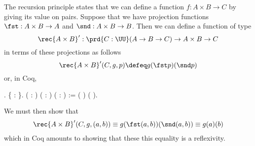  \soln 
The recursion principle states that we can define a function $f : A \times B
\to C$ by giving its value on pairs.  Suppose that we have projection functions
$\fst : A \times B \to A$ and $\snd : A \times B \to B$.  Then we can define a
function of type
\[
  \rec{A\times B}' : \prd{C : \UU} (A \to B \to C) \to A \times B \to C
\]
in terms of these projections as follows
\[
  \rec{A \times B}'(C, g, p) \defeq g(\fst p)(\snd p)
\]
or, in Coq,
\begin{coqdoccode}
\coqdocemptyline
\coqdocnoindent
{} .\coqdoceol
\coqdocindent{1.00em}
 \{  : \}.\coqdoceol
\coqdocemptyline
\coqdocindent{1.00em}
  ( : ) ( :     ) ( :   ) :=  ( ) ( ).\coqdoceol
\coqdocemptyline
\end{coqdoccode}
We must then show that
\begin{align*}
    \rec{A\times B}'(C, g, (a, b)) 
    \equiv g(\fst (a, b))(\snd (a, b))
    \equiv g(a)(b)
\end{align*}
which in Coq amounts to showing that these this equality is a reflexivity.
